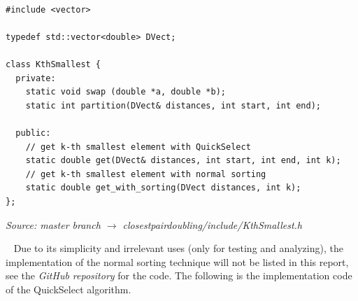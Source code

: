\documentclass[12pt,english,]{article}
\begin{document}
~

\begin{lstlisting}
#include <vector>

typedef std::vector<double> DVect;

class KthSmallest {
  private:
    static void swap (double *a, double *b);
    static int partition(DVect& distances, int start, int end);

  public:
    // get k-th smallest element with QuickSelect
    static double get(DVect& distances, int start, int end, int k);
    // get k-th smallest element with normal sorting 
    static double get_with_sorting(DVect distances, int k);
};
\end{lstlisting}
\vspace{-2truemm}
\begin{minipage}{1\textwidth}
  \begin{flushright}
  {\footnotesize \emph{Source: master branch $\rightarrow$ closestpairdoubling/include/KthSmallest.h}\par}
  \end{flushright}
\end{minipage}
\vspace{0.5truemm}

~ Due to its simplicity and irrelevant uses (only for testing and
analyzing), the implementation of the normal sorting technique will not
be listed in this report, see the \emph{GitHub repository} for the code.
The following is the implementation code of the QuickSelect algorithm.

\newpage
\end{document}
